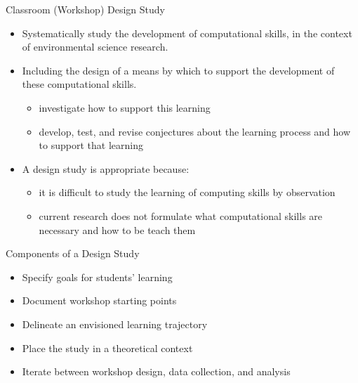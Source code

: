 \documentclass[10pt,ignorenonframetext,]{beamer}
\providecommand{\tightlist}{%
  \setlength{\itemsep}{0pt}\setlength{\parskip}{0pt}}
\begin{document}
\begin{frame}{Classroom (Workshop) Design Study}

\begin{itemize}[<+->]
\item
  Systematically study the development of computational skills, in the
  context of environmental science research.
\item
  Including the design of a means by which to support the development of
  these computational skills.

  \begin{itemize}[<+->]
  \tightlist
  \item
    investigate how to support this learning
  \item
    develop, test, and revise conjectures about the learning process and
    how to support that learning
  \end{itemize}
\end{itemize}

\vspace{1cm}

\begin{itemize}[<+->]
\tightlist
\item
  A design study is appropriate because:

  \begin{itemize}[<+->]
  \tightlist
  \item
    it is difficult to study the learning of computing skills by
    observation\\
  \item
    current research does not formulate what computational skills are
    necessary and how to be teach them
  \end{itemize}
\end{itemize}

\end{frame}

\begin{frame}{Components of a Design Study}

\begin{itemize}[<+->]
\item
  Specify goals for students' learning
\item
  Document workshop starting points
\item
  Delineate an envisioned learning trajectory
\item
  Place the study in a theoretical context
\item
  Iterate between workshop design, data collection, and analysis
\end{itemize}

\end{frame}
\end{document}
